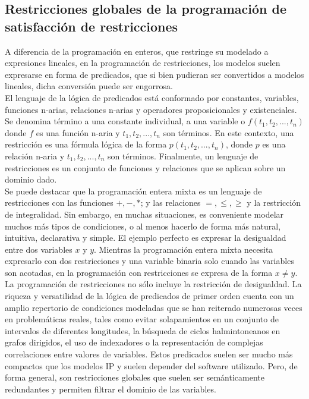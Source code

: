 \documentclass[12pt]{report}
\begin{document}
\subsection{Restricciones globales de la programación de satisfacción de restricciones}

A diferencia de la programación en enteros, que restringe su modelado a expresiones lineales, en la programación de restricciones, los modelos suelen expresarse en forma de predicados, que si bien pudieran ser convertidos a modelos lineales, dicha conversión puede ser engorrosa. \\

El lenguaje de la lógica de predicados está conformado por constantes, variables, funciones n-arias, relaciones n-arias y operadores proposicionales y existenciales. Se denomina término a una constante individual, a una variable o $f(t_1,t_2,...,t_n)$ donde $f$ es una función n-aria y $t_1,t_2,...,t_n$ son términos. En este contexto, una restricción es una fórmula lógica de la forma $p(t_1,t_2,...,t_n)$, donde $p$ es una relación n-aria y $t_1,t_2,...,t_n$ son términos. Finalmente, un lenguaje de restricciones es un conjunto de funciones y relaciones que se aplican sobre un dominio dado. \\

Se puede destacar que la programación entera mixta es un lenguaje de restricciones con las funciones $+, -, *$; y las relaciones $=,\leq,\geq$ y la restricción de integralidad. Sin embargo, en muchas situaciones, es conveniente modelar muchos más tipos de condiciones, o al menos hacerlo de forma más natural, intuitiva, declarativa y simple. El ejemplo perfecto es expresar la desigualdad entre dos variables $x$ y $y$. Mientras la programación entera mixta necesita expresarlo con dos restricciones y una variable binaria solo cuando las variables son acotadas, en la programación con restricciones se expresa de la forma $x\neq y$.\\

La programación de restricciones no sólo incluye la restricción de desigualdad. La riqueza y versatilidad de la lógica de predicados de primer orden cuenta con un amplio repertorio de condiciones modeladas que se han reiterado numerosas veces en problemáticas reales, tales como evitar solapamientos en un conjunto de intervalos de diferentes longitudes, la búsqueda de ciclos halmintoneanos en grafos dirigidos, el uso de indexadores o la representación de complejas correlaciones entre valores de variables. Estos predicados suelen ser mucho más compactos que los modelos IP y suelen depender del software utilizado. Pero, de forma general, son restricciones globales que suelen ser semánticamente redundantes y permiten filtrar el dominio de las variables. \\
\end{document}
